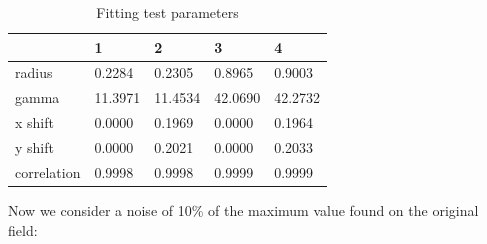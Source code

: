 \documentclass[12pt, a4paper, openany]{memoir}
\begin{document}
\begin{table}[h]
	\centering
	\caption{Fitting test parameters}
	\vspace{10px}
	\label{tb:fittingtest}
	\begin{tabular}{l|l|l|l|l}
		            & 1      & 2 & 3 & 4 \\
		\hline
		radius      & 0.2284   & 0.2305 & 0.8965 & 0.9003  \\
		gamma       & 11.3971 & 11.4534 & 42.0690 & 42.2732 \\
		x shift     & 0.0000  & 0.1969 & 0.0000 & 0.1964 \\
		y shift     & 0.0000  & 0.2021 & 0.0000 & 0.2033 \\ 
		correlation & 0.9998   & 0.9998 & 0.9999 & 0.9999 \\
	\end{tabular}
\end{table}

Now we consider a noise of 10\% of the maximum value found on the original field:
\end{document}
